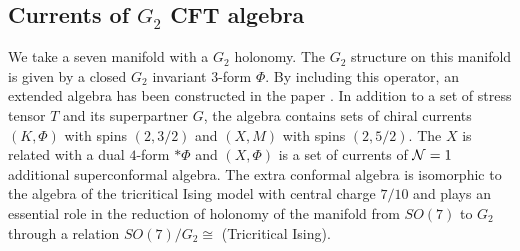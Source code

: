 \documentclass[a4paper,12pt]{article}
\numberwithin{equation}{section}
\newcommand{\Ncal}{{\cal N}}
\newcommand{\G}[1]{\mbox{$G_{#1}$}}
\begin{document}
\subsection{Currents of \G2 CFT algebra}

We take a seven manifold with a $G_2$ holonomy. The $G_2$ 
structure on this manifold is given by a closed $G_2$ 
invariant $3$-form $\Phi$. 
By including this operator, an extended algebra has been 
constructed in the paper \cite{Shatashvili:1994zw}.
In addition to a set of stress tensor $T$ and its superpartner 
$G$, 
the algebra contains sets of chiral currents $(K,\Phi)$ 
with spins $(2,3/2)$ and $(X,M)$ with spins $(2,5/2)$. 
The $X$ is related with a dual $4$-form $\ast\Phi$ and $(X,\Phi) $
is a set of currents of $\Ncal=1$ additional superconformal 
algebra. 
The extra conformal algebra is isomorphic to 
the algebra of the tricritical Ising model with 
central charge $7/10$ and 
plays an essential role in 
the reduction of holonomy of the manifold from $SO(7)$ to $G_2$ 
through a relation $SO(7)/G_2\cong$ (Tricritical Ising).
\end{document}
